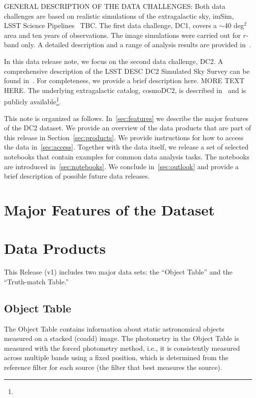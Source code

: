\documentclass[11pt]{report}
\begin{document}
GENERAL DESCRIPTION OF THE DATA CHALLENGES: Both data challenges are based on realistic simulations of the extragalactic sky, imSim, LSST Science Pipelines~\citep{2017ASPC..512..279J} TBC. The first data challenge, DC1, covers a $\sim$40 deg$^2$ area and ten years of observations. The image simulations were carried out for $r$-band only. A detailed description and a range of analysis results are provided in~\cite{dc1}. 

In this data release note, we focus on the second data challenge, DC2. A comprehensive description of the LSST DESC DC2 Simulated Sky Survey can be found in~\cite{2020arXiv201005926L}. For completeness, we provide a brief description here. MORE TEXT HERE. The underlying extragalactic catalog, cosmoDC2, is described in~\cite{korytov} and is publicly available\footnote{}.


This note is organized as follows. In~\autoref{sec:features} we describe the major features of the DC2 dataset.
We provide an overview of the data products that are part of this release in Section~\autoref{sec:products}.
We provide instructions for how to access the data in~\autoref{sec:access}.
Together with the data itself, we release a set of selected notebooks that contain examples for common data analysis tasks.
The notebooks are introduced in~\autoref{sec:notebooks}.
We conclude in~\autoref{sec:outlook} and provide a brief description of possible future data releases. 

\section{Major Features of the Dataset}
\label{sec:features}

\section{Data Products}
\label{sec:products}

This Release (v1) includes two major data sets: the ``Object Table'' and the ``Truth-match Table.'' 

\subsection{Object Table}
\label{sec:object}

The Object Table contains information about static astronomical objects measured on a stacked (coadd) image. The photometry in the Object Table is measured with the forced photometry method, i.e., it is consistently measured across multiple bands using a fixed position, which is determined from the reference filter for each source (the filter that best measures the source). 
\end{document}
